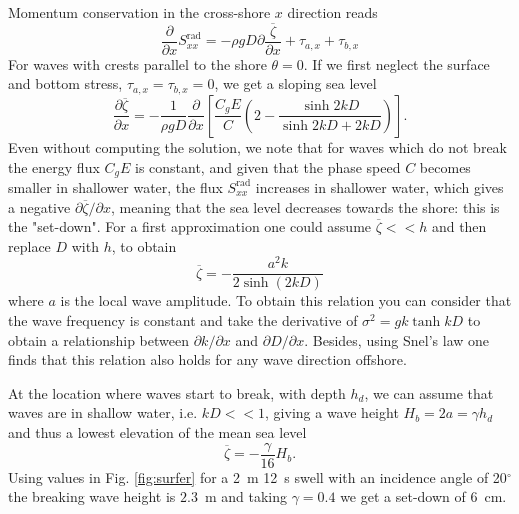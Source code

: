 Momentum conservation in the cross-shore $x$ direction reads 
\begin{equation}
    \frac{\partial }{\partial x}S^{\mathrm{rad}}_{xx}
     =  -\rho g D \partial \frac{\overline{\zeta}}{\partial x}
        + \tau_{a,x}  + \tau_{b,x}
\end{equation}
For waves with crests parallel to the shore  $\theta =0$. If we first neglect the surface and bottom stress, $\tau_{a,x}=\tau_{b,x}=0$, we get a sloping sea level 
\begin{equation}
    \frac{\partial \overline{\zeta}}{\partial x}=
        -\frac{1}{\rho g D}\frac{\partial }{\partial x}
        \left[\frac{C_g E}{C}\left(2
        - \frac{\sinh 2kD}{\sinh 2kD +2kD}\right)\right].
\end{equation}
Even without computing the solution, we note that for waves which do not break the energy flux  $C_gE$ is constant, and given that the phase speed $C$ becomes smaller in shallower water, the flux  $S^{\mathrm{rad}}_{xx}$ increases in shallower water, which gives a negative ${\partial \overline{\zeta}}/{\partial x}$, meaning that the sea level decreases towards the shore: this is the "set-down". 
 For a first approximation one could assume $\overline{\zeta} << h$ and then replace $D$ with $h$, to obtain 
\begin{equation}
    \overline{\zeta}=-\frac{a^2k}{2\sinh\left(2kD\right)} \label{setdown}
\end{equation}
where $a$ is the local wave amplitude. To obtain this relation you can consider that 
the wave frequency is constant and take the derivative of $\sigma^2=gk\tanh kD$ to obtain a relationship between  ${\partial k}/{\partial x}$ and ${\partial
D}/{\partial x}$. Besides, using Snel's law one finds that this relation also holds for any wave direction offshore. 

At the location where waves start to break, with depth  $h_d$, we can assume that waves are in shallow water, i.e. $k D<<1$, giving a wave height $H_b=2a=\gamma h_d$ and thus a lowest elevation of the mean sea level
\begin{equation}
    \overline{\zeta}=-\frac{\gamma}{16}H_b.
\end{equation}
Using values in Fig. \ref{fig:surfer} for a 2~m  12~s swell with an incidence angle of 20$^\circ$ the breaking wave height is  $2.3$~m and taking  $\gamma=0.4$  we get a set-down of 6~cm.

